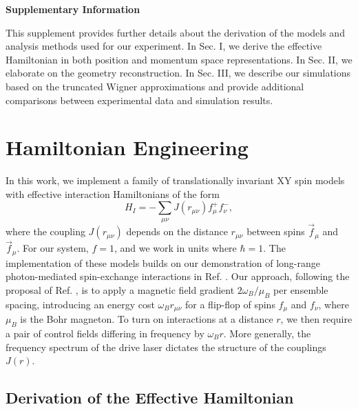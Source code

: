 \onecolumngrid
\begin{bibunit}
\begin{center}
 {\Large\textbf{Supplementary Information}}
\end{center}
\vspace*{.5cm}
\renewcommand{\figurename}{\textbf{Fig.}}
\renewcommand{\theequation}{S\arabic{equation}}
\renewcommand{\thefigure}{S\arabic{figure}}
\setcounter{equation}{0}
\setcounter{figure}{0}
\setcounter{section}{0}
This supplement provides further details about the derivation of the models and analysis methods used for our experiment.
In Sec. I, we derive the effective Hamiltonian in both position and momentum space representations. In Sec. II, we elaborate on the geometry reconstruction. In Sec. III, we describe our simulations based on the truncated Wigner approximations and provide additional comparisons between experimental data and simulation results.

\section{Hamiltonian Engineering}

In this work, we implement a family of translationally invariant XY spin models with effective interaction Hamiltonians of the form
\begin{equation}
H_I = -\sum_{\mu\nu} J(r_{\mu \nu}) f^+_\mu f^-_\nu,
\end{equation}
where the coupling $J(r_{\mu \nu})$ depends on the distance $r_{\mu \nu}$ between spins $\vec{f}_\mu$  and $\vec{f}_\mu$. For our system, $f=1$, and we work in units where $\hbar = 1$. The implementation of these models builds on our demonstration of long-range photon-mediated spin-exchange interactions in Ref. \cite{davis2019photon}.  Our approach, following the proposal of Ref. \cite{hung2016quantum}, is to apply a magnetic field gradient $2\omega_B/\mu_B$ per ensemble spacing,  introducing an energy cost $\omega_B r_{\mu\nu}$ for a flip-flop of spins $f_\mu$ and $f_\nu$, where $\mu_B$ is the Bohr magneton.  To turn on interactions at a distance $r$, we then require a pair of control fields differing in frequency by $\omega_B r$.  More generally, the frequency spectrum of the drive laser dictates the structure of the couplings $J(r)$.

\subsection{Derivation of the Effective Hamiltonian}


\end{bibunit}
